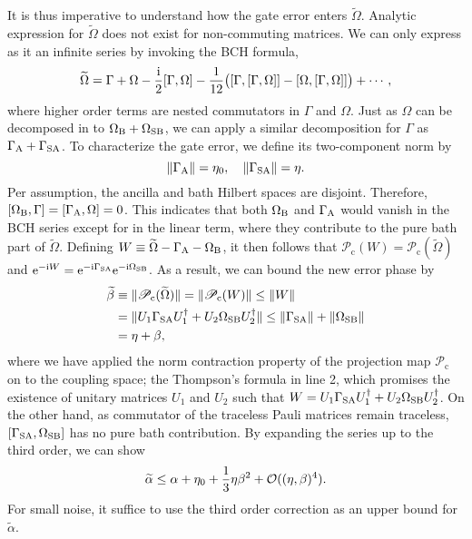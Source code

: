 \documentclass[aps,pra,reprint,superscriptaddress]{revtex4-2}
\newcommand{\alphat}{\widetilde{\alpha}}
\newcommand{\Omegat}{\widetilde{\Omega}}
\newcommand{\Pcp}{\mathscr{P}_{\mathrm{c}}}
\begin{document}
It is thus imperative to understand how the gate error enters $\Omegat$.
Analytic expression for $\Omegat$ does not exist for non-commuting matrices. We can only express as it an infinite series by invoking the BCH formula,
\begin{equation*}
    \widetilde{\Omega} = \Gamma +  \Omega - \frac{\mathrm{i}}{2} [\Gamma,\Omega]
    -\frac{1}{12}\bigl([\Gamma,[\Gamma,\Omega]]-[\Omega,[\Gamma,\Omega]]\bigr) + \cdots,
\end{equation*}
where higher order terms are nested commutators in $\Gamma$ and $\Omega$.
Just as $\Omega$ can be decomposed in to $\Omega_{\mathrm{B}} + \Omega_{\mathrm{SB}}$, we can apply a similar decomposition for $\Gamma$ as $\Gamma_{\mathrm{A}}+\Gamma_{\mathrm{SA}}$.
To characterize the gate error, we define its two-component norm by
\begin{equation}
    \Vert {\Gamma_{\mathrm{A}}} \Vert = \eta_0, \quad \Vert {\Gamma_{\mathrm{SA}}} \Vert = \eta.
\end{equation}
Per assumption, the ancilla and bath Hilbert spaces are disjoint. Therefore, $[\Omega_{\mathrm{B}},\Gamma] =[\Gamma_{\mathrm{A}},\Omega] =0 $. This indicates
that both $\Omega_{\mathrm{B}}$ and $\Gamma_{\mathrm{A}}$ would vanish in the BCH series  except for in the linear term, where they contribute to the 
pure bath part of $\Omegat$.
Defining $W \equiv \widetilde{\Omega} - \Gamma_{\mathrm{A}} -  \Omega_{\mathrm{B}}$, it then follows that $\Pcp(W)=\Pcp(\Omegat)$ and $\mathrm{e}^{-\mathrm{i} W} =  \mathrm{e}^{-\mathrm{i} \Gamma_{\mathrm{SA}}} \mathrm{e}^{-\mathrm{i} \Omega_{\mathrm{SB}}}$. As a result, we can bound the new error phase by
\begin{equation}\label{eq:beta-til-bound}
\begin{split}
    \widetilde{\beta}&\equiv\norm{\Pcp(\Omegat)} = \norm{\Pcp(W)}\le \norm{W}\\
    &= \norm{U_1 \Gamma_\rSA U_1^\dagger + U_2 \Omega_\rSB U_2^\dagger}
    \le \norm{\Gamma_\rSA} + \norm{\Omega_\rSB}\\
    &= \eta + \beta,
\end{split}    
\end{equation}
where we have applied the norm contraction property of the projection map $\Pcp$ on to the coupling space; the Thompson's formula \cite{Thompson1986} in line 2, which promises the existence of unitary matrices $U_1$ and $U_2$ such that 
$ W  = U_1 \Gamma_{\mathrm{SA}} U_1^\dagger +   U_2 \Omega_{\mathrm{SB}} U_2^\dagger$. 
On the other hand, as commutator of the traceless Pauli matrices remain traceless, $[\Gamma_{\mathrm{SA}},\Omega_{\mathrm{SB}}]$ has no pure bath contribution. By expanding the series up to the third order, we can show
\begin{equation}\label{eq:alpha-til-bound}
    \widetilde\alpha \le \alpha + \eta_0 + \frac{1}{3} \eta \beta^2+\mathcal{O}((\eta,\beta)^4).
\end{equation}
For small noise, it suffice to use the third order correction as an upper bound for $\alphat$.
\end{document}
